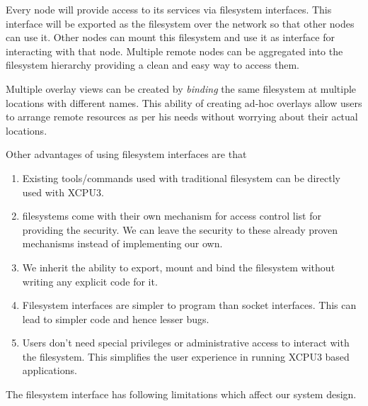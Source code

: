 \documentclass[conference]{IEEEtran}
\begin{document}
Every node will provide access to its services via filesystem interfaces.
This interface will be exported as the filesystem over the network so that other
nodes can use it. Other nodes can mount this filesystem and use it as
interface for interacting with that node.  Multiple remote nodes can be
aggregated into the filesystem hierarchy providing a clean and easy way to
access them.

Multiple overlay views can be created by \textit{binding} the same filesystem
at multiple locations with different names.  This ability of creating ad-hoc
overlays allow users to arrange remote resources as per his needs without
worrying about their actual locations.

Other advantages of using filesystem interfaces are that 
\begin{enumerate}
\item Existing tools/commands used with traditional filesystem can be directly
used with XCPU3.

\item filesystems come with their own mechanism for access control list for
providing the security.  We can leave the security to these already proven 
mechanisms instead of implementing our own.

\item We inherit the ability to export, mount and bind the filesystem
without writing any explicit code for it.

\item Filesystem interfaces are simpler to program than socket interfaces.  This
can lead to simpler code and hence lesser bugs.

\item Users don't need special privileges or administrative access to interact
with the filesystem.  This simplifies the user experience in running XCPU3 based
applications.
\end{enumerate}

The filesystem interface has following limitations which affect our system
design.
\end{document}
